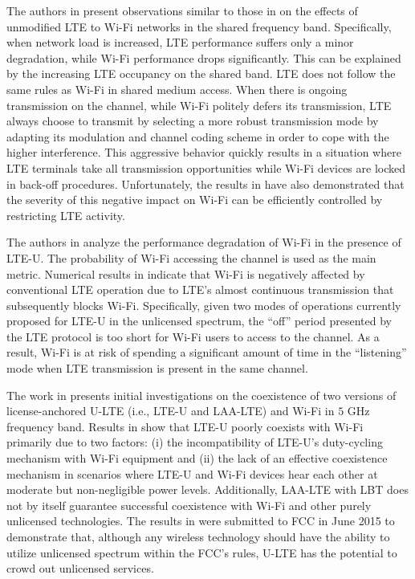 \documentclass[12pt,onecolumn]{article}
\begin{document}
The authors in \cite{original-LTE-Wi-Fi-WCNC-2013} present observations similar to those in \cite{original-LTE-Wi-Fi-VTC-2013} on the effects of unmodified LTE to Wi-Fi networks in the shared frequency band. Specifically, when network load is increased, LTE performance suffers only a minor degradation, while Wi-Fi performance drops significantly. This can be explained by the increasing LTE occupancy on the shared band. LTE does not follow the same rules as Wi-Fi in shared medium access. When there is ongoing transmission on the channel, while Wi-Fi politely defers its transmission, LTE always choose to transmit by selecting a more robust transmission mode by adapting its modulation and channel coding scheme in order to cope with the higher interference. This aggressive behavior quickly results in a situation where LTE terminals take all transmission opportunities while Wi-Fi devices are locked in back-off procedures. Unfortunately, the results in \cite{original-LTE-Wi-Fi-WCNC-2013} have also demonstrated that the severity of this negative impact on Wi-Fi can be efficiently controlled by restricting LTE activity.

The authors in \cite{LTE-U-PIMRC-2014} analyze the performance degradation of Wi-Fi in the presence of LTE-U. The probability of Wi-Fi accessing the channel is used as the main metric. Numerical results in \cite{LTE-U-PIMRC-2014} indicate that Wi-Fi is negatively affected by conventional LTE operation due to LTE's almost continuous transmission that subsequently blocks Wi-Fi. Specifically, given two modes of operations currently proposed for LTE-U in the unlicensed spectrum, the ``off'' period presented by the LTE protocol is too short for Wi-Fi users to access to the channel. As a result, Wi-Fi is at risk of spending a significant amount of time in the ``listening'' mode when LTE transmission is present in the same channel.

The work in \cite{U-LTE-Google-WP} presents initial investigations on the coexistence of two versions of license-anchored U-LTE (i.e., LTE-U and LAA-LTE) and Wi-Fi in $5$ GHz frequency band. Results in \cite{U-LTE-Google-WP} show that LTE-U poorly coexists with Wi-Fi primarily due to two factors: (i) the incompatibility of LTE-U's duty-cycling mechanism with Wi-Fi equipment and (ii) the lack of an effective coexistence mechanism in scenarios where LTE-U and Wi-Fi devices hear each other at moderate but non-negligible power levels. Additionally, LAA-LTE with LBT does not by itself guarantee successful coexistence with Wi-Fi and other purely unlicensed technologies. The results in \cite{U-LTE-Google-WP} were submitted to FCC in June 2015 to demonstrate that, although any wireless technology should have the ability to utilize unlicensed spectrum within the FCC's rules, U-LTE has the potential to crowd out unlicensed services.
\end{document}
